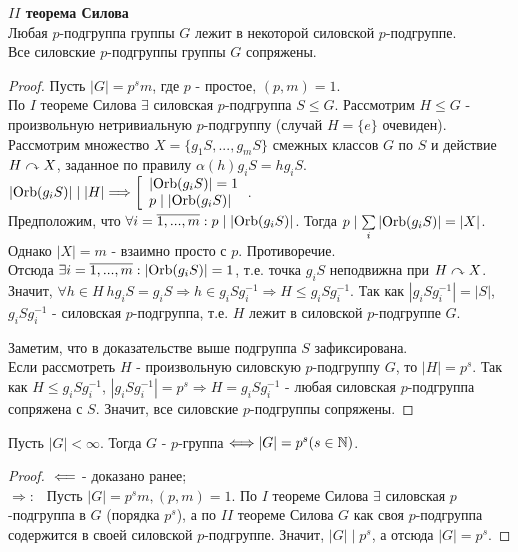 \textbf{$II$ теорема Силова}\\
Любая $p$-подгруппа группы $G$ лежит в некоторой силовской $p$-подгруппе.\\
Все силовские $p$-подгруппы группы $G$ сопряжены.
\begin{proof}
    Пусть $|G| = p^sm$, где $p$ - простое, $(p, m) = 1$.\\
    По $I$ теореме Силова $\exists$ силовская $p$-подгруппа $S \leq G$.
    Рассмотрим $H \leq G$ - произвольную нетривиальную $p$-подгруппу (случай $H= \{e\}$ очевиден).\\
    Рассмотрим множество $X = \{g_1S,...,g_mS\}$ смежных классов $G$ по $S$ и действие $H \curvearrowright X$, заданное по правилу $\alpha(h)g_iS = hg_iS$.\\
    $|\textup{Orb}(g_iS)| \mid |H| \Longrightarrow \left[\begin{array}{l}
        |\textup{Orb}(g_iS)| = 1\\
        p \mid |\textup{Orb}(g_iS)|
    \end{array}\right.$.\\
    Предположим, что $\forall i = \overline{1,...,m}: p \mid |\textup{Orb}(g_iS)|$. Тогда $p \mid \sum \limits_i |\textup{Orb}(g_iS)| = |X|$. Однако $|X| = m$ - взаимно просто с $p$. Противоречие.\\
    Отсюда $\exists i = \overline{1,...,m}: |\textup{Orb}(g_iS)| = 1$, т.е. точка $g_iS$ неподвижна при $H \curvearrowright X$. Значит, $\forall h \in H\  hg_iS = g_iS \Longrightarrow h \in g_iSg_i^{-1} \Longrightarrow H \leq g_iSg_i^{-1}$. Так как $|g_iSg_i^{-1}| = |S|$, $g_iSg_i^{-1}$ - силовская $p$-подгруппа, т.е. $H$ лежит в силовской $p$-подгруппе $G$.

    Заметим, что в доказательстве выше подгруппа $S$ зафиксирована.\\
    Если рассмотреть $H$ - произвольную силовскую $p$-подгруппу $G$, то $|H| = p^s$. Так как $H \leq g_iSg_i^{-1}$, $|g_iSg_i^{-1}| = p^s \Longrightarrow H = g_iSg_i^{-1}$ - любая силовская $p$-подгруппа сопряжена с $S$. Значит, все силовские $p$-подгруппы сопряжены.
\end{proof}
\begin{consequense}
    Пусть $|G| < \infty$. Тогда $G$ - $p$-группа $\Longleftrightarrow |G| = p^s (s\in \mathbb{N})$. 
\end{consequense}
\begin{proof}
    $ \\ \Longleftarrow$ - доказано ранее;\\
    $\Longrightarrow: \ \ $ Пусть $|G| = p^sm, (p, m) = 1$. По $I$ теореме Силова $\exists$ силовская $p$-подгруппа в $G$ (порядка $p^s$), а по $II$ теореме Силова $G$ как своя $p$-подгруппа содержится в своей силовской $p$-подгруппе. Значит, $|G| \mid p^s$, а отсюда $|G| = p^s$.
\end{proof}